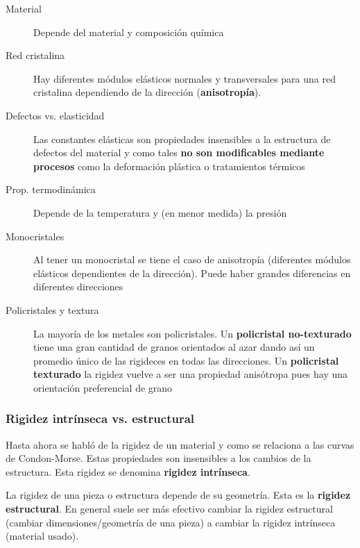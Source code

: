 \begin{description}
	\item[Material] Depende del material y composición química
	\item[Red cristalina] Hay diferentes módulos elásticos normales y transversales para una red cristalina dependiendo de la dirección (\textbf{anisotropía}). 
	\item[Defectos vs. elasticidad] Las constantes elásticas son propiedades insensibles a la estructura de defectos del material y como tales \textbf{no son modificables mediante procesos} como la deformación plástica o tratamientos térmicos
	\item[Prop. termodinámica] Depende de la temperatura y (en menor medida) la presión
	\item[Monocristales] Al tener un monocristal se tiene el caso de anisotropía (diferentes módulos elásticos dependientes de la dirección). Puede haber grandes diferencias en diferentes direcciones
	\item[Policristales y textura] La mayoría de los metales son policristales. Un \textbf{policristal no-texturado} tiene una gran cantidad de granos orientados al azar dando así un promedio único de las rigideces en todas las direcciones. Un \textbf{policristal texturado} la rigidez vuelve a ser una propiedad anisótropa pues hay una orientación preferencial de grano
\end{description}



\subsubsection{Rigidez intrínseca vs. estructural}

Hasta ahora se habló de la rigidez de un material y como se relaciona a las curvas de Condon-Morse. Estas propiedades son insensibles a los cambios de la estructura. Esta rigidez se denomina \textbf{rigidez intrínseca}.

La rigidez de una pieza o estructura depende de su geometría. Esta es la \textbf{rigidez estructural}. En general suele ser más efectivo cambiar la rigidez estructural (cambiar dimensiones/geometría de una pieza) a cambiar la rigidez intrínseca (material usado).


